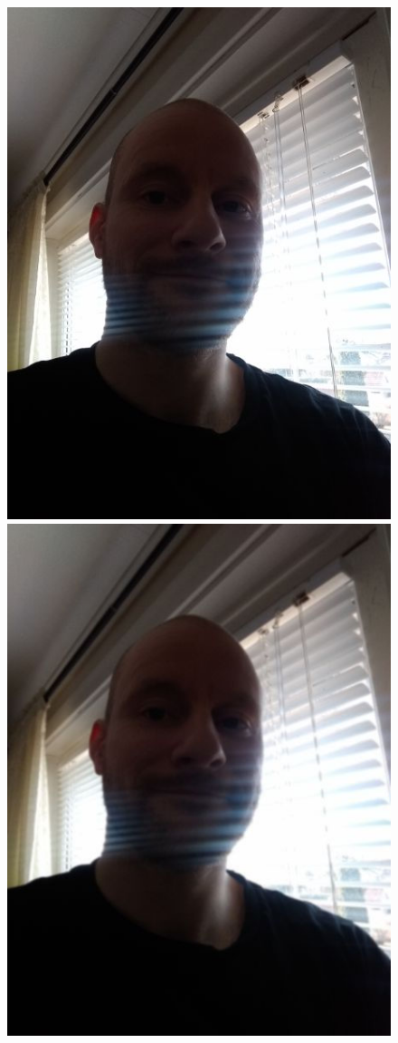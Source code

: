\begin{figure}[h]
\centering
    \subfloat
        {\includegraphics[scale = 0.13]{figures/0329.jpg}}
    \subfloat
        {\includegraphics[scale = 0.13]{figures/0329blur.jpg}}

\end{figure}
